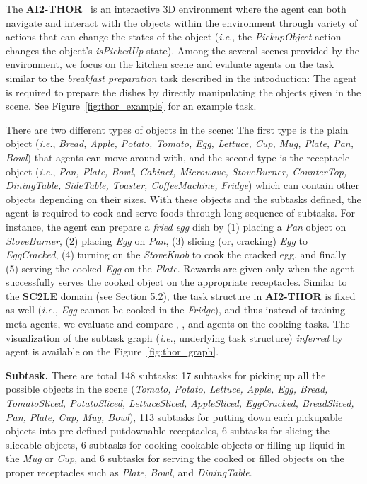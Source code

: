 \documentclass{article} \usepackage{iclr2020_conference,times}
\makeatletter
\newcommand{\tb}{\textbf}
\DeclareRobustCommand\onedot{\futurelet\@let@token\@onedot}
\def\onedot{.}
\def\ie{\emph{i.e}\onedot} \def\Ie{\emph{I.e}\onedot}
\makeatother
\begin{document}
The \tb{AI2-THOR}~\citep{ai2thor} is an interactive 3D environment where the agent can both navigate and interact with the objects within the environment through variety of actions that can change the states of the object (\ie, the \emph{PickupObject} action changes the object's \emph{isPickedUp} state).
Among the several scenes provided by the environment,
we focus on the kitchen scene and evaluate agents on the task similar to the \emph{breakfast preparation} task described in the introduction:
The agent is required to prepare the dishes by directly manipulating the objects given in the scene.
See Figure~\ref{fig:thor_example} for an example task.

There are two different types of objects in the scene: The first type is the plain object (\ie, \emph{Bread, Apple, Potato, Tomato, Egg, Lettuce, Cup, Mug, Plate, Pan, Bowl}) that agents can move around with, and the second type is the receptacle object (\ie, \emph{Pan, Plate, Bowl, Cabinet, Microwave, StoveBurner, CounterTop, DiningTable, SideTable, Toaster, CoffeeMachine, Fridge}) which can contain other objects depending on their sizes.
With these objects and the subtasks defined, the agent is required to cook and serve foods through long sequence of subtasks. 
For instance, the agent can prepare a \emph{fried egg} dish by (1) placing a \emph{Pan} object on \emph{StoveBurner}, (2) placing \emph{Egg} on \emph{Pan}, (3) slicing (or, cracking) \emph{Egg} to \emph{EggCracked}, (4) turning on the \emph{StoveKnob} to cook the cracked egg, and finally (5) serving the cooked \emph{Egg} on the \emph{Plate}.
Rewards are given only when the agent successfully serves the cooked object on the appropriate receptacles.
Similar to the \tb{SC2LE} domain (see Section 5.2), 
the task structure in \tb{AI2-THOR} is fixed as well (\ie, \emph{Egg} cannot be cooked in the \emph{Fridge}), 
and thus instead of training meta agents,
we evaluate and compare \NSGIGRProp, \HRL, and \Random agents on the cooking tasks.
The visualization of the subtask graph (\ie, underlying task structure) \emph{inferred} by \NSGIGRProp agent is available on the Figure~\ref{fig:thor_graph}.

\textbf{Subtask.}
There are total 148 subtasks: 17 subtasks for picking up all the possible objects in the scene (\emph{Tomato, Potato, Lettuce, Apple, Egg, Bread, TomatoSliced, PotatoSliced, LettuceSliced, AppleSliced, EggCracked, BreadSliced, Pan, Plate, Cup, Mug, Bowl}), 113 subtasks for putting down each pickupable objects into pre-defined putdownable receptacles, 6 subtasks for slicing the sliceable objects, 6 subtasks for cooking cookable objects or filling up liquid in the \emph{Mug} or \emph{Cup}, and 6 subtasks for serving the cooked or filled objects on the proper receptacles such as \emph{Plate}, \emph{Bowl}, and \emph{DiningTable}.
\end{document}
